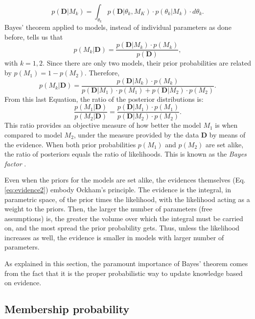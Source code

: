  \begin{equation}
p(\mathbf{D}|M_k)=\int_{\theta_k} p(\mathbf{D}|\theta_k,M_K)\cdot p(\theta_k|M_k)\cdot d\theta_k. \label{eq:evidence2}
\end{equation}
Bayes' theorem applied to models, instead of individual parameters as done before, tells us that
\begin{equation}
p(M_k|\mathbf{D})=\frac{p(\mathbf{D}|M_k)\cdot p(M_k)}{p(\mathbf{D})},
\end{equation}
with $k=1,2$. Since there are only two models, their prior probabilities are related by $p(M_1)= 1- p(M_2)$. Therefore,
 \begin{equation}
p(M_k|\mathbf{D})=\frac{p(\mathbf{D}|M_k)\cdot p(M_k)}{p(\mathbf{D}|M_1)\cdot p(M_1)+p(\mathbf{D}|M_2)\cdot p(M_2)}.
\end{equation}
From this last Equation, the ratio of the posterior distributions is:
\begin{equation}
\frac{p(M_1|\mathbf{D})}{p(M_2|\mathbf{D})}=\frac{p(\mathbf{D}|M_1)\cdot p(M_1)}{p(\mathbf{D}|M_2)\cdot p(M_2)}.
\end{equation}
This ratio provides an objective measure of how better the model $M_1$ is when compared to model $M_2$, under the measure provided by the data $\mathbf{D}$ by means of the evidence. When both prior probabilities  $p(M_1)$ and $p(M_2)$ are set alike, the ratio of posteriors equals the ratio of likelihoods. This is known as the \emph{Bayes factor} \cite[for a similar derivation and some examples of its application see][]{Kaas1995}. 

Even when the priors for the models are set alike, the evidences themselves (Eq. \ref{eq:evidence2}) embody Ockham's principle. The evidence is the integral, in parametric space, of the prior times the likelihood, with the likelihood acting as a weight to the priors.  Then, the larger the number of parameters (free assumptions) is, the greater the volume over which the integral must be carried on, and the most spread the prior probability gets. Thus, unless the likelihood increases as well, the evidence is smaller in models with larger number of parameters.

As explained in this section, the paramount importance of Bayes' theorem comes from the fact that it is the proper probabilistic way to update knowledge based on evidence.

\subsection{Membership probability}

